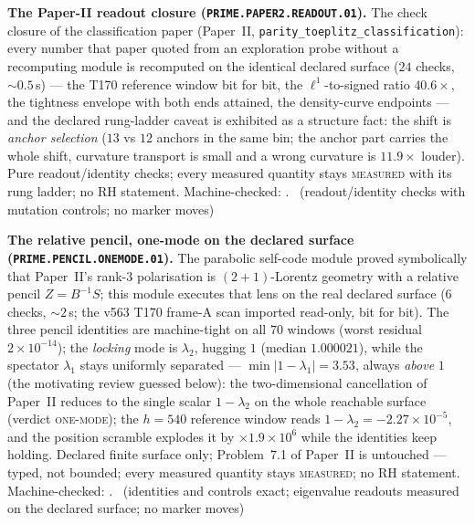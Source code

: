 \par\smallskip\noindent\textbf{The Paper-II readout closure
(\texttt{PRIME.PAPER2.READOUT.01}).}
The check closure of the classification paper (Paper~II,
\texttt{parity\_toeplitz\_classification}): every number that paper
quoted from an exploration probe without a recomputing module is
recomputed on the identical declared surface ($24$ checks,
${\sim}0.5$\,s) --- the T170 reference window bit for bit, the
$\ell^{1}$-to-signed ratio $40.6\times$, the tightness envelope with
both ends attained, the density-curve endpoints --- and the declared
rung-ladder caveat is exhibited as a structure fact: the shift is
\emph{anchor selection} ($13$ vs $12$ anchors in the same bin; the
anchor part carries the whole shift, curvature transport is small and
a wrong curvature is $11.9\times$ louder). Pure readout/identity
checks; every measured quantity stays \textsc{measured} with its rung
ladder; no RH statement. Machine-checked:
.
\mE\ (readout/identity checks with mutation controls; no marker moves)
\par\smallskip


\par\smallskip\noindent\textbf{The relative pencil, one-mode on the declared
surface (\texttt{PRIME.PENCIL.ONEMODE.01}).}
The parabolic self-code module proved symbolically that Paper~II's rank-3
polarisation is $(2{+}1)$-Lorentz geometry with a relative pencil
$Z=B^{-1}S$; this module executes that lens on the real declared surface
($6$ checks, ${\sim}2$\,s; the v563 T170 frame-A scan imported read-only,
bit for bit). The three pencil identities are machine-tight on all $70$
windows (worst residual $2\times10^{-14}$); the \emph{locking} mode is
$\lambda_2$, hugging $1$ (median $1.000021$), while the spectator
$\lambda_1$ stays uniformly separated --- $\min|1-\lambda_1|=3.53$, always
\emph{above} $1$ (the motivating review guessed below): the two-dimensional
cancellation of Paper~II reduces to the single scalar $1-\lambda_2$ on the
whole reachable surface (verdict \textsc{one-mode}); the $h=540$ reference
window reads $1-\lambda_2=-2.27\times10^{-5}$, and the position scramble
explodes it by $\times1.9\times10^{6}$ while the identities keep holding.
Declared finite surface only; Problem~7.1 of Paper~II is untouched ---
typed, not bounded; every measured quantity stays \textsc{measured}; no RH
statement. Machine-checked:
.
\mE\ (identities and controls exact; eigenvalue readouts measured on the
declared surface; no marker moves)
\par\smallskip


